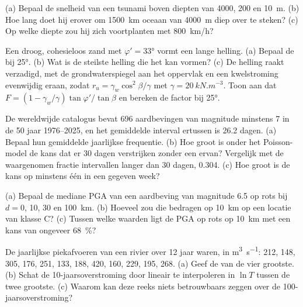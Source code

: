 \begin{exercise}[$\star$]\label{exo:b2:geological-hazards:3}
(a) Bepaal de snelheid van een tsunami boven diepten van 4000, 200 en \qty{10}{m}. (b) Hoe lang doet hij erover
om \qty{1500}{km} oceaan van \qty{4000}{m} diep over te steken? (c) Op welke diepte zou hij zich voortplanten met
\qty{800}{km/h}?
\end{exercise}

\begin{exercise}[$\star$]\label{exo:b2:geological-hazards:4}
Een droog, cohesieloos zand met $\varphi' = \ang{33}$ vormt een lange helling. (a) Bepaal de
 bij \ang{25}. (b) Wat is de steilste helling die het kan vormen? (c) De helling raakt verzadigd, met
de grondwaterspiegel aan het oppervlak en een kwelstroming evenwijdig eraan, zodat $r_u = \gamma_w\cos^2\beta/\gamma$
met $\gamma = \qty{20}{kN.m^{-3}}$. Toon aan dat $F = (1 - \gamma_w/\gamma)\tan\varphi'/\tan\beta$ en
bereken de factor bij \ang{25}.
\end{exercise}

\begin{exercise}[$\star\star$]\label{exo:b2:geological-hazards:5}
De wereldwijde catalogus bevat 696 aardbevingen van magnitude minstens 7 in de 50 jaar 1976--2025, en
het gemiddelde interval ertussen is 26.2 dagen. (a) Bepaal hun gemiddelde jaarlijkse frequentie. (b) Hoe groot is onder het
Poisson-model de kans dat er 30 dagen verstrijken zonder een ervan? Vergelijk met de waargenomen
fractie intervallen langer dan 30 dagen, 0.304. (c) Hoe groot is de kans op minstens één in een
gegeven week?
\end{exercise}

\begin{exercise}[$\star\star$]\label{exo:b2:geological-hazards:6}
(a) Bepaal de mediane PGA van een aardbeving van magnitude 6.5 op rots bij $d = 0$, 10, 30 en
\qty{100}{km}. (b) Hoeveel zou die bedragen op \qty{10}{km} op een locatie van klasse C? (c) Tussen welke waarden
ligt de PGA op rots op \qty{10}{km} met een kans van ongeveer \qty{68}{\percent}?
\end{exercise}

\begin{exercise}[$\star\star$]\label{exo:b2:geological-hazards:7}
De jaarlijkse piekafvoeren van een rivier over 12 jaar waren, in \unit{m^3.s^{-1}}: 212, 148, 305, 176, 251, 133, 188,
420, 160, 229, 195, 268. (a) Geef de  van de vier grootste. (b) Schat de
10-jaarsoverstroming door lineair te interpoleren in $\ln T$ tussen de twee grootste. (c) Waarom kan deze reeks
niets betrouwbaars zeggen over de 100-jaarsoverstroming?
\end{exercise}

